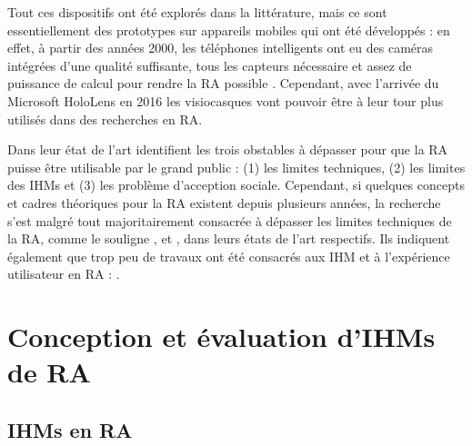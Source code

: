 

Tout ces dispositifs ont été explorés dans la littérature, mais ce sont essentiellement des prototypes sur appareils mobiles qui ont été développés : en effet, à partir des années 2000, les téléphones intelligents ont eu des caméras intégrées d'une qualité suffisante, tous les capteurs nécessaire et assez de puissance de calcul pour rendre la RA possible \citep{Huang2013}. Cependant, avec l'arrivée du Microsoft HoloLens en 2016 les visiocasques vont pouvoir être à leur tour plus utilisés dans des recherches en RA.

Dans leur état de l'art \cite{Azuma2001} identifient les trois obstables à dépasser pour que la RA puisse être utilisable par le grand public : (1) les limites techniques, (2) les limites des IHMs et (3) les problème d'acception sociale. Cependant, si quelques concepts et cadres théoriques pour la RA existent depuis plusieurs années, la recherche s'est malgré tout majoritairement consacrée à dépasser les limites techniques de la RA, comme le souligne \cite{Zhou2008}, \cite{VanKrevelen2010} et \cite{Billinghurst2015}, dans leurs états de l'art respectifs. Ils indiquent également que trop peu de travaux ont été consacrés aux IHM et à l'expérience utilisateur en RA :  \citep{Billinghurst2015}.


\section{Conception et évaluation d'IHMs de RA}
\label{sec:litterature_ar_hci}

\subsection{IHMs en RA}
\label{subsec:litterature_ar_hci_presentation}

